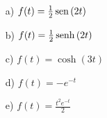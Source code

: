 \begin{resp}
 \begin{itemize}
  \item[a)] $f(t)=\frac{1}{2}\operatorname{sen}\,(2t)$
  \item[b)] $f(t)=\frac{1}{2}\operatorname{senh}\,(2t)$ 
  \item[c)] $f(t)=\cosh(3t)$
  \item[d)] $f(t)=-e^{-t}$ 
  \item[e)] $f(t)=\frac{t^2e^{-t}}{2}$ 
  \end{itemize}
\end{resp}
